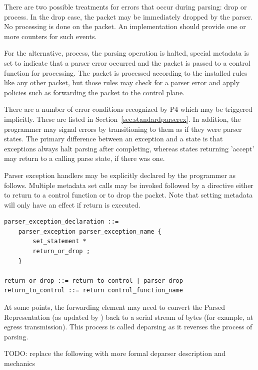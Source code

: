 \documentclass[12pt]{article}
\begin{document}

There are two possible treatments for errors that occur during parsing: drop 
or process. In the drop case, the packet may be immediately dropped by the 
parser. No \matchaction processing is done on the packet. An implementation 
should provide one or more counters for such events.

For the alternative, process, the parsing operation is halted, special metadata 
is set to indicate that a parser error occurred and the packet is passed to 
a control function for \matchaction processing. The packet is processed according 
to the installed \matchaction rules like any other packet, but those rules 
may check for a parser error and apply policies such as forwarding the packet 
to the control plane.

There are a number of error conditions recognized by P4 which may be triggered
implicitly. These are listed in Section~\ref{sec:standardparserex}. In addition,
the programmer may signal errors by transitioning to them as if they were parser
states. The primary difference between an exception and a state is that
exceptions always halt parsing after completing, whereas states returning
'accept' may return to a calling parse state, if there was one.

Parser exception handlers may be explicitly declared by the programmer as 
follows. Multiple metadata set calls may be invoked followed by a directive 
either to return to a control function or to drop the packet. Note that setting 
metadata will only have an effect if return is executed.

\begin{lstlisting}[style=BNFstyle]
parser_exception_declaration ::=
    parser_exception parser_exception_name {
        set_statement *
        return_or_drop ;
    }

return_or_drop ::= return_to_control | parser_drop
return_to_control ::= return control_function_name
\end{lstlisting}


At some points, the forwarding element may need to convert the Parsed 
Representation (as updated by \matchaction) back to a serial stream of bytes 
(for example, at egress transmission). This process is called deparsing as it 
reverses the process of parsing.

TODO: replace the following with more formal deparser description and mechanics
\end{document}
